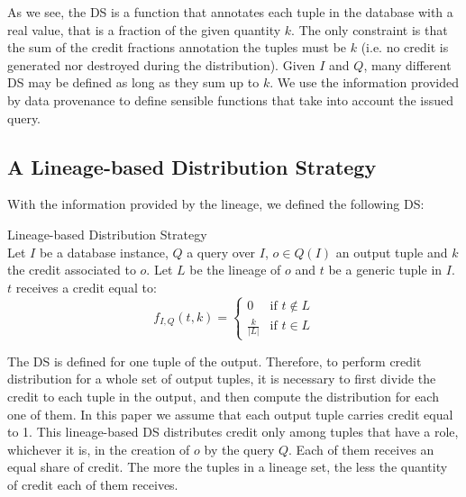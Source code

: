 As we see, the DS is a function that annotates each tuple in the database with a real value, that is a fraction of the given quantity $k$. The only constraint is that the sum of the credit fractions annotation the tuples must be $k$ (i.e. no credit is generated nor destroyed during the distribution).
Given $I$ and $Q$, many different DS may be defined as long as they sum up to $k$. We use the information provided by data provenance to define sensible functions that take into account the issued query. 

\subsection{A Lineage-based Distribution Strategy}
With the information provided by the lineage, we defined the following DS:

\begin{definition}{Lineage-based Distribution Strategy}~\citep{dosso2020data}
    \label{def:lineage_ds}\\
    Let $I$ be a database instance, $Q$ a query over $I$, $o \in Q(I)$ an output tuple and $k$ the credit associated to $o$.
    Let $L$ be the lineage of $o$ and $t$ be a generic tuple in $I$. $t$ receives a credit equal to:
    \begin{equation*}
        f_{I, Q}(t, k) =  \begin{cases}
         0 & \mbox{if $t \notin L$} \\
            \frac{k}{|L|} & \mbox{if $t \in L$}
        \end{cases}
    \end{equation*}
\end{definition}

%

The DS is defined for one tuple of the output. Therefore, to perform credit distribution for a whole set of output tuples, it is necessary to first divide the credit to each tuple in the output, and then compute the distribution for each one of them.
In this paper we assume that each output tuple carries credit equal to 1. 
This lineage-based DS distributes credit only among tuples that have a role, whichever it is, in the creation of $o$ by the query $Q$. Each of them receives an equal share of credit. The more the tuples in a lineage set, the less the quantity of credit each of them receives. 


